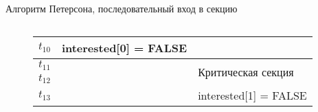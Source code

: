 \documentclass[aspectratio=169,14pt]{beamer}
\begin{document}
\begin{frame}[containsverbatim]{Алгоритм Петерсона, последовательный вход в секцию}
\begin{columns}
\begin{column}{0.68\textwidth}
\begin{figure}[htp]
\begin{tiny}
\begin{tabular}{p{0.5cm}|p{2.4cm}|p{2.4cm}}
                        $t_{10}$ & interested[0] = FALSE & \\ \hline
                        $t_{11}$ & & \multirow{2}{=}{Критическая секция} \\ \cline{1-2}
                        $t_{12}$ & & \\ \hline
                        $t_{13}$ & & interested[1] = FALSE \\ \hline
                    \end{tabular}
                \end{tiny}
            \end{figure}
        \end{column}
    \end{columns}
\end{frame}


\end{document}
